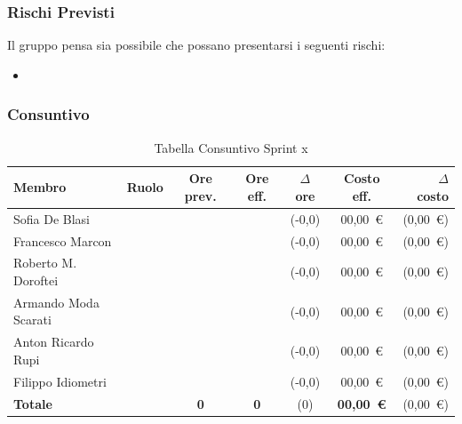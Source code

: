 \subsubsection{Rischi Previsti}
Il gruppo pensa sia possibile che possano presentarsi i seguenti rischi:
\begin{itemize}
    \item 
\end{itemize}

\subsubsection{Consuntivo}
\begin{table}[H]
    \centering
    \renewcommand{\arraystretch}{1.3}
    \begin{tabularx}{\textwidth}{|X|c|c|c|c|c|r|}
        \hline
        \textbf{Membro} & \textbf{Ruolo} & \textbf{Ore prev.} &
        \textbf{Ore eff.} & \textbf{$\Delta$ ore} &
        \textbf{Costo eff.} & \textbf{$\Delta$ costo} \\
        \hline
        Sofia De Blasi           &  &  &  & {\color{green}(-0,0)} & 00{,}00~\euro & {\color{green}(0{,}00~\euro)} \\
        Francesco Marcon         &  &  &  & {\color{green}(-0,0)} & 00{,}00~\euro & {\color{green}(0{,}00~\euro)} \\
        Roberto M. Doroftei      &  &  &  & {\color{green}(-0,0)} & 00{,}00~\euro & {\color{green}(0{,}00~\euro)} \\
        Armando Moda Scarati     &  &  &  & {\color{green}(-0,0)} & 00{,}00~\euro & {\color{green}(0{,}00~\euro)} \\
        Anton Ricardo Rupi       &  &  &  & {\color{green}(-0,0)} & 00{,}00~\euro & {\color{green}(0{,}00~\euro)} \\
        Filippo Idiometri        &  &  &  & {\color{green}(-0,0)} & 00{,}00~\euro & {\color{green}(0{,}00~\euro)} \\
        \hline
        \textbf{Totale}          &    & \textbf{0} &
        \textbf{0} & {\color{green}(0)} &
        \textbf{00{,}00~\euro} & {\color{green}(0{,}00~\euro)} \\
        \hline
    \end{tabularx}
    \caption{Tabella Consuntivo Sprint x}   
\end{table}
